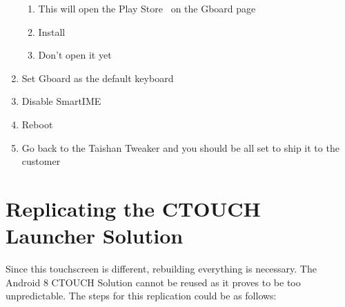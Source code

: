 \begin{enumerate}
\begin{enumerate}
        \item{This will open the Play Store \faGooglePlay \ on the Gboard page}
        \item{\faPlayCircle Install}
        \item Don't open it yet
    \end{enumerate}
    \item Set Gboard as the default keyboard\faKeyboard
    \item Disable SmartIME
    \item Reboot
    \item Go back to the Taishan Tweaker and you should be all set to ship it to the customer
\end{enumerate}

\section{Replicating the CTOUCH Launcher Solution}

Since this touchscreen is different, rebuilding everything is necessary. The Android 8 CTOUCH Solution cannot be reused as it proves to be too unpredictable. The steps for this replication could be as follows:

